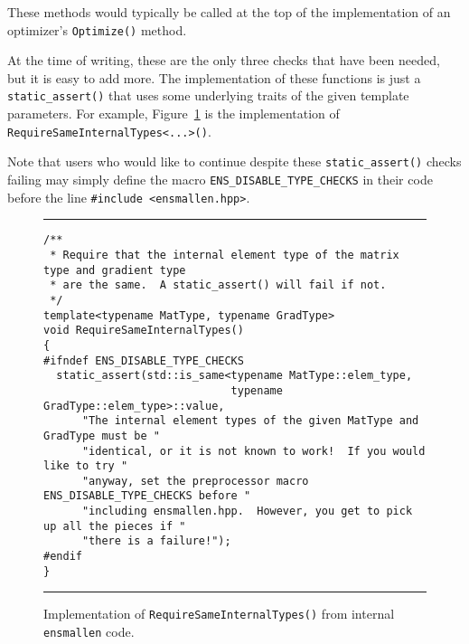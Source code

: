 These methods would typically be called at the top of the implementation of an
optimizer's {\tt Optimize()} method.

At the time of writing, these are the only three checks that have
been needed, but it is easy to add more.  The implementation of these functions
is just a {\tt static\_assert()} that uses some underlying traits of the given
template parameters.  For example, Figure~\ref{fig:rsit} is the implementation
of {\tt RequireSameInternalTypes<...>()}.

Note that users who would like to continue despite these {\tt static\_assert()}
checks failing may simply define the macro {\tt ENS\_DISABLE\_TYPE\_CHECKS} in
their code before the line {\tt \#include <ensmallen.hpp>}.


\begin{figure}[t]
\hrule
\vspace{1ex}
\begin{verbatim}
/**
 * Require that the internal element type of the matrix type and gradient type
 * are the same.  A static_assert() will fail if not.
 */
template<typename MatType, typename GradType>
void RequireSameInternalTypes()
{
#ifndef ENS_DISABLE_TYPE_CHECKS
  static_assert(std::is_same<typename MatType::elem_type,
                             typename GradType::elem_type>::value,
      "The internal element types of the given MatType and GradType must be "
      "identical, or it is not known to work!  If you would like to try "
      "anyway, set the preprocessor macro ENS_DISABLE_TYPE_CHECKS before "
      "including ensmallen.hpp.  However, you get to pick up all the pieces if "
      "there is a failure!");
#endif
}
\end{verbatim}
\hrule
\vspace*{-0.5em}
\caption{Implementation of {\tt RequireSameInternalTypes()} from internal
{\tt ensmallen} code.
}
\label{fig:rsit}
\end{figure}
